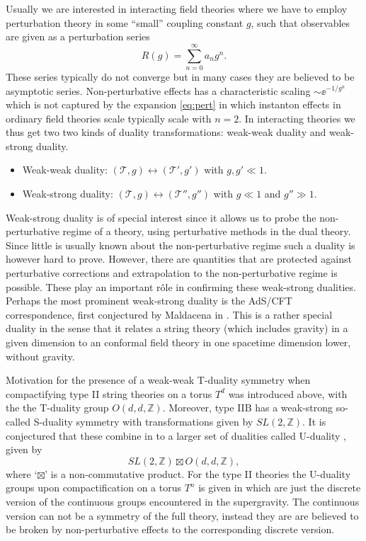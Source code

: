 Usually we are interested in interacting field theories where we have to employ perturbation theory in some ``small'' coupling constant $g$, such that observables are given as a perturbation series
\begin{equation}\label{eq:pert}
    R(g) = \sum_{n=0}^{\infty}a_n g^n.
\end{equation}
These series typically do not converge but in many cases they are believed to be asymptotic series. Non-perturbative effects has a characteristic scaling $\sim \ee^{-1/g^n}$ which is not captured by the expansion \eqref{eq:pert} in which instanton effects in ordinary field theories scale typically scale with $n=2$. In interacting theories we thus get two two kinds of duality transformations: weak-weak duality and weak-strong duality. 
\begin{itemize}
    \item Weak-weak duality: $\left(\mathscr{T},g\right)\leftrightarrow\left(\mathscr{T}',g'\right)$ with $g,g'\ll 1$.
    \item Weak-strong duality: $\left(\mathscr{T},g\right)\leftrightarrow\left(\mathscr{T}'',g''\right)$ with $g\ll 1$ and $g''\gg 1$.
\end{itemize}
Weak-strong duality is of special interest since it allows us to probe the non-perturbative regime of a theory, using perturbative methods in the dual theory. Since little is usually known about the non-perturbative regime such a duality is however hard to prove. However, there are quantities that are protected against perturbative corrections and extrapolation to the non-perturbative regime is possible. These play an important rôle in confirming these weak-strong dualities. Perhaps the most prominent weak-strong duality is the AdS/CFT correspondence, first conjectured by Maldacena in \cite{Maldacena1999}. This is a rather special duality in the sense that it relates a string theory (which includes gravity) in a given dimension to an conformal field theory in one spacetime dimension lower, without gravity. 

Motivation for the presence of a weak-weak T-duality symmetry when compactifying type II string theories on a torus $T^d$ was introduced above, with the the T-duality group $O(d,d,\mathbb{Z})$. Moreover, type IIB has a weak-strong so-called S-duality symmetry with transformations given by $SL(2,\mathbb{Z})$. It is conjectured that these combine in to a larger set of dualities called U-duality \cite{Hull:1994ys}, given by 
\begin{equation}
    SL(2,\mathbb{Z})\boxtimes O(d,d,\mathbb{Z}),
\end{equation}
where `$\boxtimes$' is a non-commutative product. For the type II theories the U-duality groups upon compactification on a torus $T^{n}$ is given in  which are just the discrete version of the continuous groups encountered in the supergravity. The continuous version can not be a symmetry of the full theory, instead they are are believed to be broken by non-perturbative effects to the corresponding discrete version. 

